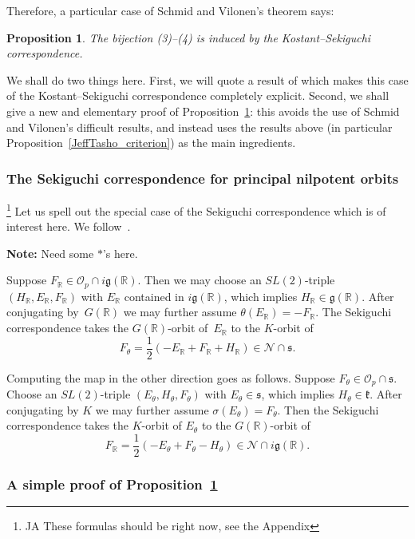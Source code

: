 \documentclass[10pt,leqno]{article}
\newtheorem{proposition}[equation]{Proposition}
\renewcommand{\O}{\mathcal O}
\newcommand{\R}{\mathbb R}
\newcommand{\N}{\mathcal N}
\renewcommand{\k}{\mathfrak k}
\newcommand{\g}{\mathfrak g}
\newcommand{\s}{\mathfrak s}
\newcommand{\Op}{\O_p}
\begin{document}
Therefore, a particular case of Schmid and Vilonen's theorem says: 
\begin{proposition} \label{Sekiguchi_result} The bijection (3)--(4) is induced by the Kostant--Sekiguchi correspondence.
\end{proposition} 
We shall do two things here. First, we will quote a result of \cite{AVAV} which makes this case of the Kostant--Sekiguchi correspondence completely explicit. Second, we shall give a new and elementary proof of Proposition~\ref{Sekiguchi_result}: this avoids the use of Schmid and Vilonen's difficult results, and instead uses the results above (in particular Proposition~\ref{JeffTasho_criterion}) as the main ingredients. 


\subsubsection{The Sekiguchi correspondence for principal nilpotent orbits}\label{sec:concrete_sek}
\footnote{JA These formulas should be right now, see the Appendix}
Let us spell out the special case of the Sekiguchi correspondence which is of interest here. We follow~\cite[Section~2]{AVAV}.

{\bf Note:} Need some $*$'s here.

Suppose $F_\R\in \Op\cap i\g(\R)$. Then we may choose an $SL(2)$-triple $(H_\R,E_\R,F_\R)$ with $E_\R$  contained in $i\g(\R)$,
which implies $H_\R\in \g(\R)$. 
After conjugating by~$G(\R)$ we may further assume $\theta(E_\R)=-F_\R$.
The Sekiguchi correspondence takes the $G(\R)$-orbit of~$E_\R$ to the $K$-orbit of
$$
F_\theta=\frac12(-E_\R+F_\R+H_\R)\in \N\cap \s.
$$

Computing the map in the other direction goes as follows.
Suppose $F_\theta\in \Op\cap\s$. Choose an $SL(2)$-triple  $(E_\theta, H_\theta,F_\theta)$ with
$E_\theta\in\s$, which implies $H_\theta\in\k$. After conjugating by $K$ we may further assume $\sigma(E_\theta)=F_\theta$.
Then the Sekiguchi correspondence takes the $K$-orbit of $E_\theta$ to the $G(\R)$-orbit of 
\begin{equation}\label{def_F_R}
F_\R=\frac 12(-E_\theta+F_\theta-H_\theta)\in\N\cap i\g(\R).
\end{equation}

\subsubsection{A simple proof of Proposition~\ref{Sekiguchi_result}}\label{sec:sekiguchi_proof}
\end{document}
